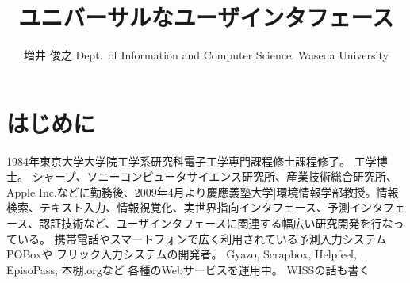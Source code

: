 \documentclass{compsoft}
\begin{document}
\title{ユニバーサルなユーザインタフェース}

%
\author{増井 俊之
%
%
%
%
%
{Dept.\ of Information and Computer Science, Waseda University}
%
\shutten
%
%
}

%
%
%
\maketitle

\section{はじめに}

{1984年東京大学大学院工学系研究科電子工学専門課程修士課程修了。
工学博士。
シャープ、ソニーコンピュータサイエンス研究所、産業技術総合研究所、Apple Inc.などに勤務後、2009年4月より慶應義塾大学]環境情報学部教授。情報検索、テキスト入力、情報視覚化、実世界指向インタフェース、予測インタフェース、認証技術など、ユーザインタフェースに関連する幅広い研究開発を行なっている。
携帯電話やスマートフォンで広く利用されている予測入力システムPOBoxや
フリック入力システムの開発者。
Gyazo, Scrapbox, Helpfeel, EpisoPass, 本棚.orgなど
各種のWebサービスを運用中。
WISSの話も書く
}
\end{document}
